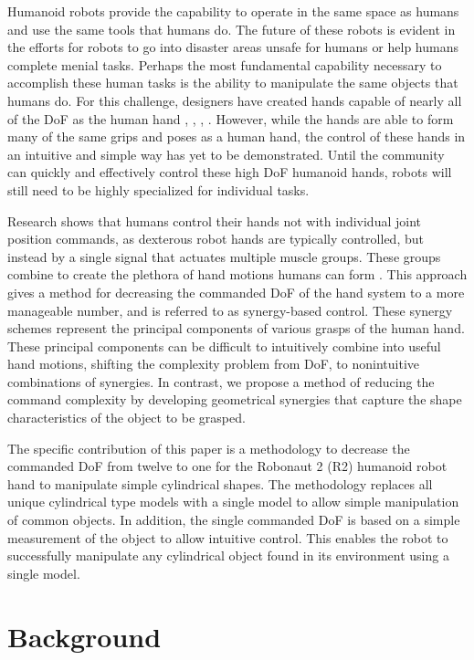 \documentclass[runningheads,a4paper]{llncs}
\begin{document}
Humanoid robots provide the capability to operate in the same space as humans and use the same tools that humans do. The future of these robots is evident in the efforts for robots to go into disaster areas unsafe for humans \cite{fukushima_robots} or help humans complete menial tasks. Perhaps the most fundamental capability necessary to accomplish these human tasks is the ability to manipulate the same objects that humans do. For this challenge, designers have created hands capable of nearly all of the DoF as the human hand \cite{r2_hand}, \cite{DRL}, \cite{hrp3}, \cite{softhand}. However, while the hands are able to form many of the same grips and poses as a human hand, the control of these hands in an intuitive and simple way has yet to be demonstrated. Until the community can quickly and effectively control these high DoF humanoid hands, robots will still need to be highly specialized for individual tasks. \par
Research shows that humans control their hands not with individual joint position commands, as dexterous robot hands are typically controlled, but instead by a single signal that actuates multiple muscle groups. These groups combine to create the plethora of hand motions humans can form \cite{Santello} \cite{neuro}. This approach gives a method for decreasing the commanded DoF of the hand system to a more manageable number, and is referred to as synergy-based control. These synergy schemes represent the principal components of various grasps of the human hand. These principal components can be difficult to intuitively combine into useful hand motions, shifting the complexity problem from DoF, to nonintuitive combinations of synergies. In contrast, we propose a method of reducing the command complexity by developing geometrical synergies that capture the shape characteristics of the object to be grasped. \par
The specific contribution of this paper is a methodology to decrease the commanded DoF from twelve to one for the Robonaut 2 (R2) humanoid robot hand to manipulate simple cylindrical shapes. The methodology replaces all unique cylindrical type models with a single model to allow simple manipulation of common objects. In addition, the single commanded DoF is based on a simple measurement of the object to allow intuitive control. This enables the robot to successfully manipulate any cylindrical object found in its environment using a single model.

\section{Background}
\end{document}
